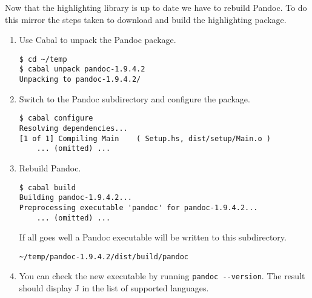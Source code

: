 Now that the highlighting library is up to date we have to rebuild
Pandoc. To do this mirror the steps taken to download and build the
highlighting package.

\begin{enumerate}
\item
  Use Cabal to unpack the Pandoc package.

\begin{tcolorbox}[breakable, size=fbox, boxrule=1pt, pad at break*=1mm,colback=cellbackground, colframe=cellborder]
\begin{verbatim}
$ cd ~/temp
$ cabal unpack pandoc-1.9.4.2
Unpacking to pandoc-1.9.4.2/
\end{verbatim}
\end{tcolorbox}
\item
  Switch to the Pandoc subdirectory and configure the package.

\begin{tcolorbox}[breakable, size=fbox, boxrule=1pt, pad at break*=1mm,colback=cellbackground, colframe=cellborder]
\begin{verbatim}
$ cabal configure
Resolving dependencies...
[1 of 1] Compiling Main    ( Setup.hs, dist/setup/Main.o )
    ... (omitted) ...
\end{verbatim}
\end{tcolorbox}
\item
  Rebuild Pandoc.

\begin{tcolorbox}[breakable, size=fbox, boxrule=1pt, pad at break*=1mm,colback=cellbackground, colframe=cellborder]
\begin{verbatim}
$ cabal build 
Building pandoc-1.9.4.2...
Preprocessing executable 'pandoc' for pandoc-1.9.4.2...
    ... (omitted) ...
\end{verbatim}
\end{tcolorbox}

  If all goes well a
  Pandoc executable will be written to this subdirectory.

\begin{tcolorbox}[breakable, size=fbox, boxrule=1pt, pad at break*=1mm,colback=cellbackground, colframe=cellborder]
\begin{verbatim}
~/temp/pandoc-1.9.4.2/dist/build/pandoc
\end{verbatim}
\end{tcolorbox}
\item
  You can check the new executable by running
  \texttt{pandoc -{}-version}. The result should display J in the list
  of supported languages.
\end{enumerate}

